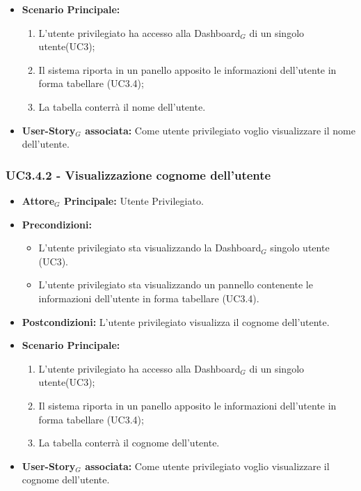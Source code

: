 \documentclass[11pt]{article}
\begin{document}
\begin{justify}
\begin{itemize}
      \item \textbf{Scenario Principale:}
        \begin{enumerate}
            \item L'utente privilegiato ha accesso alla Dashboard$_G$ di un singolo utente(UC3);
            \item Il sistema riporta  in un panello apposito le informazioni dell'utente in forma tabellare (UC3.4);
            \item La tabella conterrà il nome dell'utente.
        \end{enumerate}
     \item \textbf{User-Story$_G$ associata:}
       Come utente privilegiato voglio visualizzare il nome dell'utente.
\end{itemize}

\subsubsection{\textbf{UC3.4.2 - Visualizzazione cognome dell'utente}}
\label{UC3.4.2}
\begin{itemize}
     \item \textbf{Attore$_G$ Principale:} Utente Privilegiato.
     \item \textbf{Precondizioni:}
        \begin{itemize}
    	\item L'utente privilegiato sta visualizzando la Dashboard$_G$ singolo utente (UC3).
          \item L'utente privilegiato sta visualizzando un pannello contenente le informazioni dell'utente in forma tabellare (UC3.4).
        \end{itemize}
      \item \textbf{Postcondizioni:} L'utente privilegiato visualizza il cognome dell'utente. 
      \item \textbf{Scenario Principale:}
        \begin{enumerate}
            \item L'utente privilegiato ha accesso alla Dashboard$_G$ di un singolo utente(UC3);
            \item Il sistema riporta  in un panello apposito le informazioni dell'utente in forma tabellare (UC3.4);
            \item La tabella conterrà il cognome dell'utente.
        \end{enumerate}
     \item \textbf{User-Story$_G$ associata:}
       Come utente privilegiato voglio visualizzare il cognome dell'utente.
\end{itemize}


\end{justify}
\end{document}
